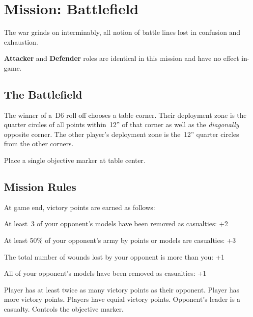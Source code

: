 \clearpage
\section{Mission: Battlefield}


The war grinds on interminably, all notion of battle lines lost in
confusion and exhaustion.

\begin{squishitemize}
\item \textbf{Attacker} and \textbf{Defender} roles are identical in
  this mission and have no effect in-game.
\end{squishitemize}

\subsection{\bf The Battlefield}%

The winner of a~D6 roll off chooses a table corner.  Their deployment
zone is the quarter circles of all points within~12'' of that corner
as well as the \emph{diagonally} opposite corner.  The other player's
deployment zone is the~12'' quarter circles from the other corners.

Place a single objective marker at table center.


\subsection{\bf Mission Rules}%

At game end, victory points are earned as follows:

\begin{squishitemize}
\item At least~3 of your opponent's models have been removed as
  casualties: +2

\item At least 50\% of your opponent's army by points or models are
  casualties: +3

\item The total number of wounds lost by your opponent is more than
  you: +1

\item All of your opponent's models have been removed as casualties:
  +1
\end{squishitemize}

\vfill

\scoringbox%
{Player has at least twice as many victory points as their opponent.}%
{Player has more victory points.}%
{Players have equial victory points.}%
{Opponent's leader is a casualty.}%
{Controls the objective marker.}
